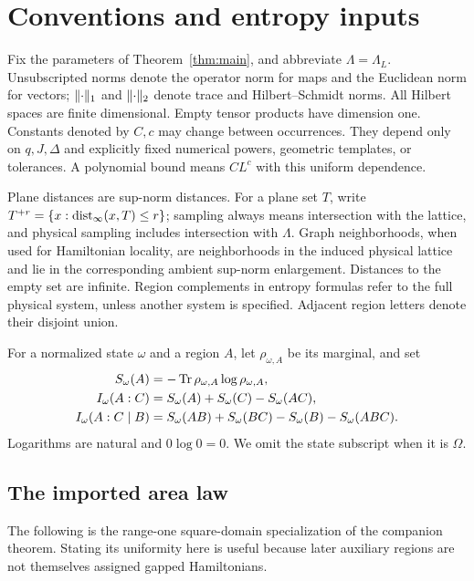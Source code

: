 \section{Conventions and entropy inputs}\label{sec:preliminaries}

Fix the parameters of Theorem~\ref{thm:main}, and abbreviate
$\Lambda=\Lambda_L$. Unsubscripted norms denote the operator norm for maps
and the Euclidean norm for vectors; $\lVert \cdot\rVert_1$ and
$\lVert \cdot\rVert_2$ denote trace and Hilbert--Schmidt norms. All Hilbert spaces
are finite dimensional. Empty tensor products have dimension one.
Constants denoted by $C,c$ may change between occurrences. They depend only
on $q,J,\Delta$ and explicitly fixed numerical powers, geometric templates,
or tolerances. A polynomial bound means $CL^c$ with this uniform dependence.

Plane distances are sup-norm distances. For a plane set $T$, write
$T^{+r}=\{x:\operatorname{dist}_\infty(x,T)\le r\}$; sampling always means intersection
with the lattice, and physical sampling includes intersection with $\Lambda$.
Graph neighborhoods, when used for Hamiltonian locality, are neighborhoods
in the induced physical lattice and lie in the corresponding ambient
sup-norm enlargement. Distances to the empty set are infinite. Region
complements in entropy formulas refer to the full physical system, unless
another system is specified. Adjacent region letters denote their disjoint
union.

For a normalized state $\omega$ and a region $A$, let $\rho_{\omega,A}$
be its marginal, and set
\begin{align*}
 S_\omega(A)&=-\operatorname{Tr}\rho_{\omega,A}\log\rho_{\omega,A},\\
 I_\omega(A:C)&=S_\omega(A)+S_\omega(C)-S_\omega(AC),\\
 I_\omega(A:C\mid B)&=S_\omega(AB)+S_\omega(BC)
                    -S_\omega(B)-S_\omega(ABC).
\end{align*}
Logarithms are natural and $0\log0=0$. We omit the state subscript when it
is $\Omega$.

\subsection{The imported area law}

The following is the range-one square-domain specialization of the companion
theorem. Stating its uniformity here is useful because later auxiliary
regions are not themselves assigned gapped Hamiltonians.

